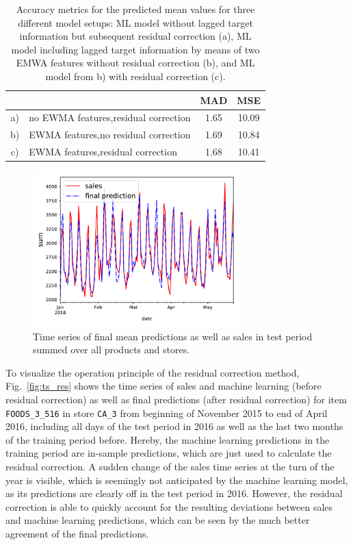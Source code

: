 \documentclass[BCOR=1mm, DIV=calc,10pt,
twoside=true,
twocolumn,
headings=normal]{scrartcl}
\newcommand{\fig}{Fig.~}
\begin{document}
\begin{table}[h!]
\begin{center}
\caption{Accuracy metrics for the predicted mean values for three different model setups: ML model without lagged target information but subsequent residual correction (a), ML model including lagged target information by means of two EMWA features without residual correction (b), and ML model from b) with residual correction (c).}
\label{tab:mad_mse}
\begin{tabular}{c|p{4cm}|c|c}
 & & \textbf{MAD} & \textbf{MSE} \\
\hline
a) & no EWMA features,\newline residual correction & 1.65 & 10.09 \\
\hline
b) & EWMA features,\newline no residual correction & 1.69 & 10.84 \\
\hline
c) & EWMA features,\newline residual correction & 1.68 & 10.41
\end{tabular}
\end{center}
\end{table}

\begin{figure}
\begin{center}
\includegraphics[width=8cm]{ts_full}
\caption{\label{fig:mean_prediction} Time series of final mean predictions as well as sales in test period summed over all products and stores.}
\end{center}
\end{figure}

To visualize the operation principle of the residual correction method, \fig \ref{fig:ts_res} shows the time series of sales and machine learning (before residual correction) as well as final predictions (after residual correction) for item \texttt{FOODS\_3\_516} in store \texttt{CA\_3} from beginning of November 2015 to end of April 2016, including all days of the test period in 2016 as well as the last two months of the training period before. Hereby, the machine learning predictions in the training period are in-sample predictions, which are just used to calculate the residual correction. A sudden change of the sales time series at the turn of the year is visible, which is seemingly not anticipated by the machine learning model, as its predictions are clearly off in the test period in 2016. However, the residual correction is able to quickly account for the resulting deviations between sales and machine learning predictions, which can be seen by the much better agreement of the final predictions.
\end{document}
